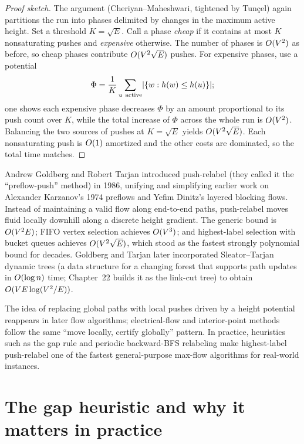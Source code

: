\begin{proof}[Proof sketch]
The argument (Cheriyan--Maheshwari, tightened by Tun\c{c}el) again partitions the run into phases delimited by changes in the maximum active height. Set a threshold $K=\sqrt{E}$. Call a phase \emph{cheap} if it contains at most $K$ nonsaturating pushes and \emph{expensive} otherwise. The number of phases is $O(V^2)$ as before, so cheap phases contribute $O(V^2\sqrt{E})$ pushes. For expensive phases, use a potential
\[
  \Phi = \frac{1}{K} \sum_{u\ \text{active}} \lvert\{w:h(w)\le h(u)\}\rvert;
\]
one shows each expensive phase decreases $\Phi$ by an amount proportional to its push count over $K$, while the total increase of $\Phi$ across the whole run is $O(V^2)$. Balancing the two sources of pushes at $K=\sqrt E$ yields $O(V^2\sqrt E)$. Each nonsaturating push is $O(1)$ amortized and the other costs are dominated, so the total time matches.
\end{proof}

\begin{historybox}
Andrew Goldberg and Robert Tarjan introduced push-relabel (they called it the ``preflow-push''
method) in 1986, unifying and simplifying earlier work on Alexander Karzanov's 1974 preflows
and Yefim Dinitz's layered blocking flows. Instead of maintaining a valid flow along end-to-end paths,
push-relabel moves fluid locally downhill along a discrete height gradient. The generic bound
is $O(V^2E)$; FIFO vertex selection achieves $O(V^3)$; and highest-label selection with bucket
queues achieves $O(V^2\sqrt{E})$, which stood as the fastest strongly polynomial bound for decades.
Goldberg and Tarjan later incorporated Sleator--Tarjan dynamic trees (a data structure for a changing forest that supports path updates in $O(\log n)$ time; Chapter~22 builds it as the link-cut tree) to obtain $O(VE\log(V^2/E))$.

The idea of replacing global paths with local pushes driven by a height potential
reappears in later flow algorithms; electrical-flow and interior-point methods follow the same
``move locally, certify globally'' pattern. In practice, heuristics such as the gap
rule and periodic backward-BFS relabeling make highest-label push-relabel one of the fastest general-purpose
max-flow algorithms for real-world instances.
\end{historybox}

\section{The gap heuristic and why it matters in practice}
\label{ch13:gap}

